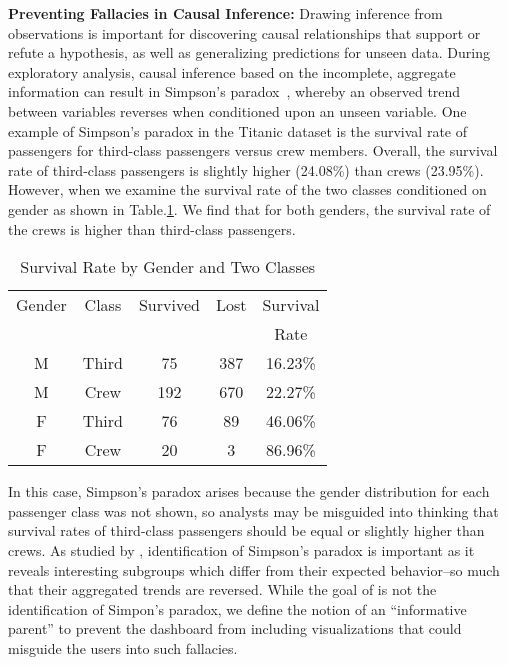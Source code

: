 \npar \textbf{Preventing Fallacies in Causal Inference:} Drawing inference from observations is important for discovering causal relationships that support or refute a hypothesis, as well as generalizing predictions for unseen data. During exploratory analysis, causal inference based on the incomplete, aggregate information can result in Simpson's paradox~\cite{Guo2017}, whereby an observed trend between variables reverses when conditioned upon an unseen variable. 
\npar One example of Simpson's paradox in the Titanic dataset is the survival rate of passengers for third-class passengers versus crew members. Overall, the survival rate of third-class passengers is slightly higher (24.08\%) than crews (23.95\%). However, when we examine the survival rate of the two classes conditioned on gender as shown in Table.\ref{tab:t2}. We find that for both genders, the survival rate of the crews is higher than third-class passengers.  
\begin{table}[thb]
	\caption{Survival Rate by Gender and Two Classes}
    \label{tab:t2}
	\begin{center}    
	\begin{tabular}{ccccc}
	\toprule
	Gender & Class & Survived & Lost & Survival\\
	& & & & Rate\\
	\midrule
	M & Third & 75 & 387 & 16.23\%\\ 
	M & Crew & 192 & 670 & 22.27\%\\ 
	\bottomrule
    F & Third & 76 & 89 & 46.06\%\\ 
	F & Crew & 20 & 3 & 86.96\%\\ 
	\bottomrule
	\end{tabular}
    \end{center}
\end{table}
In this case, Simpson's paradox arises because the gender distribution for each passenger class was not shown, so analysts may be misguided into thinking that survival rates of third-class passengers should be equal or slightly higher than crews.
As studied by \cite{Alipourfard2018,Guo2017}, identification of Simpson's paradox is important as it reveals interesting subgroups which differ from their expected behavior--so much that their aggregated trends are reversed. While the goal of \system is not the identification of Simpon's paradox, we define the notion of an ``informative parent'' to prevent the dashboard from including visualizations that could misguide the users into such fallacies. 

